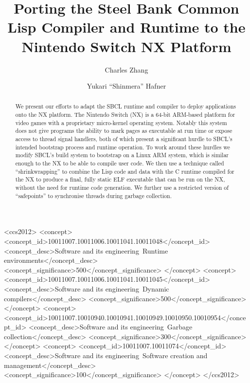 \documentclass[format=sigconf]{acmart}
\begin{document}
\title{Porting the Steel Bank Common Lisp Compiler and Runtime to the Nintendo Switch NX Platform}

\author{Charles Zhang}
\author{Yukari ``Shinmera'' Hafner}

\begin{CCSXML}
<ccs2012>
   <concept>
       <concept_id>10011007.10011006.10011041.10011048</concept_id>
       <concept_desc>Software and its engineering~Runtime environments</concept_desc>
       <concept_significance>500</concept_significance>
       </concept>
   <concept>
       <concept_id>10011007.10011006.10011041.10011045</concept_id>
       <concept_desc>Software and its engineering~Dynamic compilers</concept_desc>
       <concept_significance>500</concept_significance>
       </concept>
   <concept>
       <concept_id>10011007.10010940.10010941.10010949.10010950.10010954</concept_id>
       <concept_desc>Software and its engineering~Garbage collection</concept_desc>
       <concept_significance>300</concept_significance>
       </concept>
   <concept>
       <concept_id>10011007.10011074</concept_id>
       <concept_desc>Software and its engineering~Software creation and management</concept_desc>
       <concept_significance>100</concept_significance>
       </concept>
 </ccs2012>
\end{CCSXML}


\begin{abstract}
  We present our efforts to adapt the SBCL runtime and compiler to deploy applications onto the NX platform. The Nintendo Switch (NX) is a 64-bit ARM-based platform for video games with a proprietary micro-kernel operating system. Notably this system does not give programs the ability to mark pages as executable at run time or expose access to thread signal handlers, both of which present a significant hurdle to SBCL's intended bootstrap process and runtime operation. To work around these hurdles we modify SBCL's build system to bootstrap on a Linux ARM system, which is similar enough to the NX to be able to compile user code. We then use a technique called ``shrinkwrapping'' to combine the Lisp code and data with the C runtime compiled for the NX to produce a final, fully static ELF executable that can be run on the NX, without the need for runtime code generation. We further use a restricted version of ``safepoints'' to synchronise threads during garbage collection.
\end{abstract}
\end{document}

